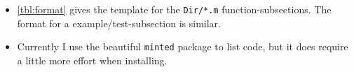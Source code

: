 \begin{itemize}
\begin{table}
\begin{verbatim}
\subsection{\texttt{...}}
\label{sec:...}
Summary LaTeX explanation.
\begin{matlab}
%}
function ...
%{
\end{matlab}
Repeated as desired:
LaTeX between end-matlab and begin-matlab
\begin{matlab}
%}
Matlab code between %} and %{
%{
\end{matlab}
Concluding LaTeX before following final line.
%}
\end{verbatim}
\hrulefill
\end{table}
\item \autoref{tbl:format} gives the template for the \verb|Dir/*.m| function-subsections.
The format for a example\slash test-subsection is similar.

\item Currently I use the beautiful \verb|minted| package to list code, but it does require a little more effort when installing.

\end{itemize}
